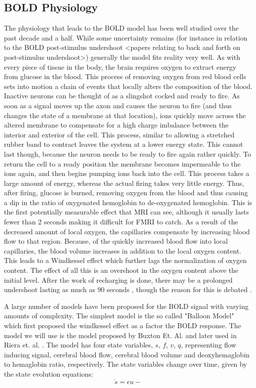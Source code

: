 \documentclass{article}
\begin{document}
\subsection*{BOLD Physiology}
The physiology that leads to the BOLD model has been well studied over the 
past decade and a half. While some uncertainty remains (for instance in
relation to the BOLD post-stimulus undershoot <papers relating to back and
forth on post-stimulus undershoot>) generally the model fits reality very 
well. As with every piece of tissue in the body, the brain requires oxygen
to extract energy from glucose in the blood. This process of removing oxygen
from red blood cells sets into motion a chain of events that locally 
alters the composition of the blood. Inactive neurons can be thought of
as a slingshot cocked and ready to fire. As soon as a signal moves up
the axon and causes the neuron to fire (and thus changes the state
of a membrane at that location), ions quickly move across the altered
membrane to compensate for a high charge imbalance between the interior
and exterior of the cell. This process, similar to allowing a stretched
rubber band to contract leaves the system at a lower energy state. This cannot
last though, because the neuron needs to be ready to fire again rather quickly.
To return the cell to a ready position the membrane becomes impermeable
to the ions again, and then begins pumping ions back into the cell. This
process takes a large amount of energy, whereas the actual firing takes
very little energy. Thus, after firing, glucose is burned, removing oxygen
from the blood and thus causing a dip in the ratio of oxygenated hemoglobin to 
de-oxygenated hemoglobin. This is the first potentially measurable effect
that MRI can see, although it usually lasts fewer than 2 seconds making it
difficult for FMRI to catch. As a result of the decreased amount of local oxygen,
the capillaries compensate by increasing blood flow to that region. Because,
of the quickly increased blood flow into local capillaries, the blood
volume increases in addition to the local oxygen content. This leads to a Windkessel
effect which further lags the normalization of oxygen content. The effect of
all this is an overshoot in the oxygen content above the initial level. After
the work of recharging is done, there may be a prolonged undershoot lasting
as much as 90 seconds \cite{spatial_poststim}, though the reason for this
is debated \cite{origin_poststim}. 

A large number of models have been proposed for the BOLD signal with varying
amounts of complexity. The simplest model is the so called "Balloon Model"
which first proposed the windkessel effect as a factor the BOLD response.
The model we will use is the model proposed by Buxton Et. Al. and later used
in Riera et. al. \cite{Riera}. The model has four state variables, $s$, $f$,
$v$, $q$, representing flow inducing signal, cerebral blood flow, cerebral
blood volume and deoxyhemaglobin to hemaglobin ratio, respectively. The 
state variables change over time, given by the state evolution equations:
\begin{equation}
\dot{s} = \epsilon u -  
\end{equation}
\end{document}
